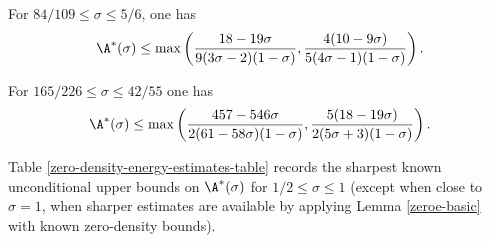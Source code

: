 \begin{theorem}\label{imp-energy-bound8}
For $84/109 \le \sigma \le 5/6$, one has
\[
\A^*(\sigma) \le \max\left(\frac{18 - 19\sigma}{9(3\sigma - 2)(1 - \sigma)}, \frac{4(10 - 9\sigma)}{5(4\sigma - 1)(1 - \sigma)}\right).
\]
\end{theorem}
\derived
{}


\begin{theorem}\label{ze-guthmaynard-thm2}
For $165/226 \le \sigma \le 42/55$ one has
\[
\A^*(\sigma) \le \max\left(\frac{457 - 546\sigma}{2(61 - 58\sigma)(1 - \sigma)}, \frac{5(18 - 19\sigma)}{2(5\sigma + 3)(1 - \sigma)}\right).
\]
\end{theorem}
\derived
{}


Table \ref{zero-density-energy-estimates-table} records the sharpest known unconditional upper bounds on $\A^*(\sigma)$ for $1/2 \le \sigma \le 1$ (except when close to $\sigma = 1$, when sharper estimates are available by applying Lemma \ref{zeroe-basic} with known zero-density bounds).
